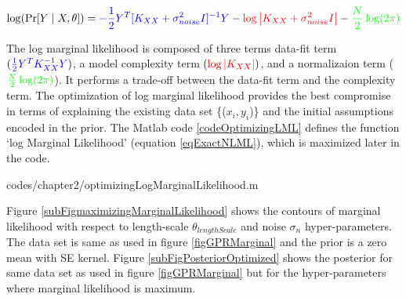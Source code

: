   \begin{equation}\label{eqExactNLML}
\log(\Pr [Y \mid X, \theta ]) = \textcolor{blue}{-\frac{1}{2}Y^{T}[K_{XX}+ \sigma_{noise}^{2}I]^{-1}Y} - \textcolor{red}{\log\left |  K_{XX}+ \sigma_{noise}^{2}I\right |} - \textcolor{green}{\frac{N}{2}\log(2\pi)}
  \end{equation}

The log marginal likelihood is composed of three terms data-fit term $( \textcolor{blue}{\frac{1}{2}Y^{T}K_{XX}^{-1}Y})$, a model complexity term $( \textcolor{red}{\log\left |  K_{XX}\right |})$, and a normalizaion term ($\textcolor{green}{\frac{N}{2}\log(2\pi)}$). It performs a trade-off between the data-fit term and the complexity term. The optimization of log marginal likelihood provides the best compromise in terms of explaining the existing data set \{($x_{i}, y_{i}$)\} and the initial assumptions encoded in the prior. The Matlab code \ref{codeOptimizingLML} defines the function `log Marginal Likelihood' (equation \ref{eqExactNLML}), which is maximized later in the code.

\begin{mdframed}[hidealllines=true,backgroundcolor=lightgray!20]

                    {codes/chapter2/optimizingLogMarginalLikelihood.m}
\end{mdframed}

Figure \ref{subFigmaximizingMarginalLikelihood} shows the contours of marginal likelihood with respect to length-scale $\theta_{lengthScale}$ and noise $\sigma_{n}$ hyper-parameters. The data set is same as used in figure \ref{figGPRMarginal} and the prior is a zero mean with SE kernel. Figure \ref{subFigPosteriorOptimized} shows the posterior for same data set as used in figure \ref{figGPRMarginal} but for the hyper-parameters where marginal likelihood is maximum. 

